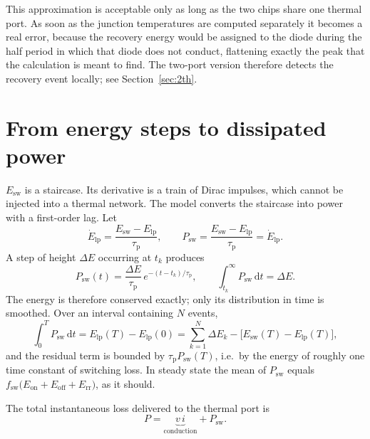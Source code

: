 \documentclass[11pt,a4paper]{article}
\begin{document}
This approximation is acceptable only as long as the two chips share one
thermal port. As soon as the junction temperatures are computed separately it
becomes a real error, because the recovery energy would be assigned to the
diode during the half period in which that diode does not conduct, flattening
exactly the peak that the calculation is meant to find. The two-port version
therefore detects the recovery event locally; see Section~\ref{sec:2th}.

\section{From energy steps to dissipated power}

$E_\mathrm{sw}$ is a staircase. Its derivative is a train of Dirac impulses,
which cannot be injected into a thermal network. The model converts the
staircase into power with a first-order lag. Let
\begin{equation}
  \dot{E}_\mathrm{lp} = \frac{E_\mathrm{sw} - E_\mathrm{lp}}{\tau_\mathrm{p}},
  \qquad
  P_\mathrm{sw} = \frac{E_\mathrm{sw} - E_\mathrm{lp}}{\tau_\mathrm{p}}
                = \dot{E}_\mathrm{lp}.
  \label{eq:lag}
\end{equation}
A step of height $\Delta E$ occurring at $t_k$ produces
\begin{equation}
  P_\mathrm{sw}(t) = \frac{\Delta E}{\tau_\mathrm{p}}\,
                     e^{-(t-t_k)/\tau_\mathrm{p}},
  \qquad
  \int_{t_k}^{\infty} P_\mathrm{sw}\,\mathrm{d}t = \Delta E .
\end{equation}
The energy is therefore conserved exactly; only its distribution in time is
smoothed. Over an interval containing $N$ events,
\begin{equation}
  \int_{0}^{T} P_\mathrm{sw}\,\mathrm{d}t
  = E_\mathrm{lp}(T) - E_\mathrm{lp}(0)
  = \sum_{k=1}^{N}\Delta E_k
    - \bigl[E_\mathrm{sw}(T) - E_\mathrm{lp}(T)\bigr],
\end{equation}
and the residual term is bounded by $\tau_\mathrm{p}P_\mathrm{sw}(T)$, i.e.\ by
the energy of roughly one time constant of switching loss. In steady state the
mean of $P_\mathrm{sw}$ equals $f_\mathrm{sw}\bigl(E_\mathrm{on} +
E_\mathrm{off} + E_\mathrm{rr}\bigr)$, as it should.

The total instantaneous loss delivered to the thermal port is
\begin{equation}
  P = \underbrace{v\,i}_{\text{conduction}} + P_\mathrm{sw}.
\end{equation}
\end{document}
